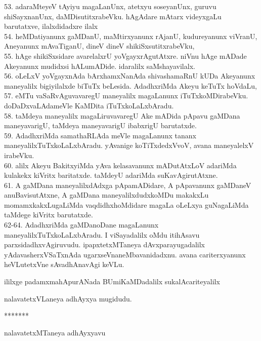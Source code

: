 \documentclass{article}
\begin{document}
53. adaraMteyeV tAyiyu magaLanUnx, atetxyu soseyanUnx, guruvu shiSayxnanUnx, daMDisutitxrabeVku. hAgAdare mAtarx videyxgaLu barutatxve, ilalxdidadxre ilalx\\
54. heMDatiyanunx gaMDanU, maMtirxyanunx rAjanU, kudureyanunx viVranU, Aneyanunx mAvaTiganU, dineV dineV shikiSxsutitxrabeVku,\\
55. hAge shikiSxsidare avarelalxrU yoVgayxrAgutAtxre. niVnu hAge mADade Akeyanunx mudidxsi hALumADide. idaralilx saMshayavilalx.\\
56. oLeLxV yoVgayxnAda bArxhamxNanAda shivashamaRnU kUDa Akeyanunx maneyalilx bigiyilalxde biTuTx beLesida. AdadhxriMda Akeyu keTuTx hoVdaLu,\\
57. eMTu vaSaRvAguvavaregU maneyalilx magaLanunx iTuTxkoMDirabeVku. doDaDxvaLAdameVle KaMDita iTuTxkoLaLxbAradu.\\
58. taMdeya maneyalilx magaLiruvavaregU Ake mADida pApavu gaMDana maneyavarigU, taMdeya maneyavarigU ibabxrigU barutatxde.\\
59. AdadhxriMda samathaRLAda meVle magaLanunx tananx maneyalilxTuTxkoLaLxbAradu. yAvanige koTiTxdedxVvoV, avana maneyalelxV irabeVku.\\
60. alilx Akeyu BakitxyiMda yAva kelasavanunx mADutAtxLoV adariMda kulakekx kiVritx baritatxde. taMdeyU adariMda suKavAgirutAtxne.\\
61. A gaMDana maneyalilxdAdxga pApamADidare, A pApavanunx gaMDaneV anuBavisutAtxne, A gaMDana maneyalilxdudxkoMDu makakxLu momamxkakxLugaLiMda vaqdidhxhoMdidare magaLa oLeLxya guNagaLiMda taMdege kiVritx barutatxde.\\
62-64. AdadhxriMda gaMDanoDane magaLanunx maneyalilxTuTxkoLaLxbAradu. I viSayadalilx oMdu itihAsavu parxsidadhxvAgiruvudu. ipapxtetxMTaneya dAvxparayugadalilx yAdavasherxVSaTxnAda ugarxseVnaneMbavanidadxnu. avana cariterxyanunx heVLutetxVne sAvadhAnavAgi keVLu.\\

\begin{center}
ililxge padamxmahApurANada BUmiKaMDadalilx sukalAcariteyalilx
\end{center}

\begin{center}
nalavatetxVLaneya adhAyxya mugidudu.
\end{center}

\begin{center}
*******
\end{center}

\begin{center}
nalavatetxMTaneya adhAyxyavu
\end{center}
\end{document}
